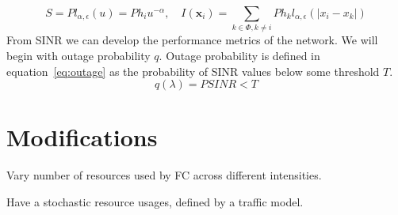 %
\begin{equation}\label{eq:Powers}
  S = Pl_{\alpha,\epsilon}(u) = Ph_iu^{-\alpha},\quad I(\textbf{x}_i)=\sum_{k\in \Phi,k\neq i} Ph_kl_{\alpha,\epsilon}(|x_i-x_k|)
\end{equation}
%
From SINR we can develop the performance metrics of the network.  We will begin with outage probability $q$.  Outage probability is defined in equation~\eqref{eq:outage} as the probability of SINR values below some threshold $T$.
%
\begin{equation}\label{eq:outage}
  q(\lambda) = P{SINR<T}
\end{equation}
%
\section{Modifications}
%
Vary number of resources used by FC across different intensities.\par
%
Have a stochastic resource usages, defined by a traffic model.\par
%
